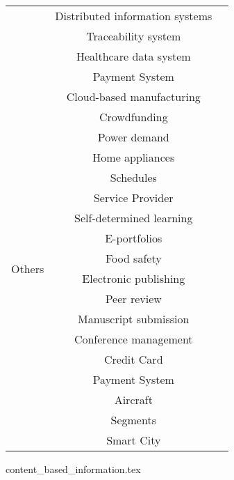 \begin{longtable}{ |c|c|p{4cm}| }
	 & Distributed information systems & \cite{2016_Azaria} \\ \cline{2-3}
	 & Traceability system & \cite{2016_Tian} \\ \cline{2-3}
	 & Healthcare data system & \cite{2016_Yue} \\ \cline{2-3}
	 & Payment System & \cite{2017_Jaag} \\
	 \hline
	 \multirow{18}{*}{Others} & Cloud-based manufacturing & \cite{2016_Bahga} \\ \cline{2-3}
	 & Crowdfunding & \cite{2016_Jacynycz} \\ \cline{2-3}
	 & Power demand & \multirow{3}{*}{\cite{2016_Kianmajd}} \\ \cline{2-2}
	 & Home appliances &  \\ \cline{2-2}
	 & Schedules &  \\ \cline{2-3}
	 & Service Provider & \cite{2016_Schaub} \\ \cline{2-3}
	 & Self-determined learning & \multirow{2}{*}{\cite{2016_Sharples}} \\ \cline{2-2}
	 & E-portfolios & \\ \cline{2-3}
	 & Food safety & \cite{2016_Tian} \\ \cline{2-3}
	 & Electronic publishing & \multirow{4}{*}{\cite{2017_Gipp}} \\ \cline{2-2}
	 & Peer review & \\ \cline{2-2}
	 & Manuscript   submission & \\ \cline{2-2}
	 & Conference management & \\ \cline{2-3}
	 & Credit Card & \multirow{2}{*}{\cite{2017_Jaag}} \\ \cline{2-2}
	 & Payment System & \\ \cline{2-3}
	 & Aircraft & \multirow{2}{*}{\cite{2017_Madhwal}} \\ \cline{2-2}
	 & Segments &  \\ \cline{2-3}
	 & Smart City & \cite{2018_Alessandra} \\
	 \hline
\end{longtable}

\clearpage
{content_based_information.tex}
